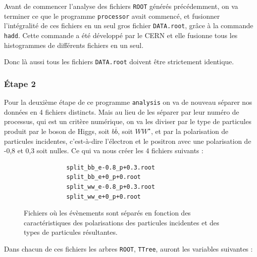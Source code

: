 \documentclass[10pt,a4paper]{report}
\newcommand{\cad}{c'est-à-dire\xspace}
\newcommand{\ROOT}{\texttt{ROOT}\xspace}
\newcommand{\processor}{\texttt{processor}\xspace}
\newcommand{\analysis}{\texttt{analysis}\xspace}
\newcommand{\bbar}{\overline{b}}
\newcommand{\Wstar}{W^{\star}}
\begin{document}
Avant de commencer l'analyse des fichiers \ROOT générés précédemment, on va terminer ce que le programme \processor avait commencé, et fusionner l'intégralité de ces fichiers en un seul gros fichier \texttt{DATA.root}, grâce à la commande \texttt{hadd}. 
Cette commande a été développé par le CERN et elle fusionne tous les histogrammes de différents fichiers en un seul. 

Donc là aussi tous les fichiers \texttt{DATA.root} doivent être strictement identique.

\subsubsection{Étape 2}

Pour la deuxième étape de ce programme \analysis on va de nouveau séparer nos données en 4 fichiers distincts. 
Mais au lieu de les séparer par leur numéro de processus, qui est un critère numérique, on va les diviser par le type de particules produit par le boson de Higgs, soit $b\bbar$, soit $W\Wstar$, et par la polarisation de particules incidentes, \cad l'électron et le positron avec une polarisation de -0,8 et 0,3 soit nulles.
Ce qui va nous créer les 4 fichiers suivants :

\begin{figure}[h!]
	\centering
	\begin{lstlisting}
			split_bb_e-0.8_p+0.3.root
			split_bb_e+0_p+0.root
			split_ww_e-0.8_p+0.3.root
			split_ww_e+0_p+0.root
	\end{lstlisting}
	\label{files:split}
	\caption{Fichiers où les évènements sont séparés en fonction des caractéristiques des polarisations des particules incidentes et des types de particules résultantes.}
\end{figure}

Dans chacun de ces fichiers les arbres \ROOT, \texttt{TTree}, auront les variables suivantes :
\end{document}
